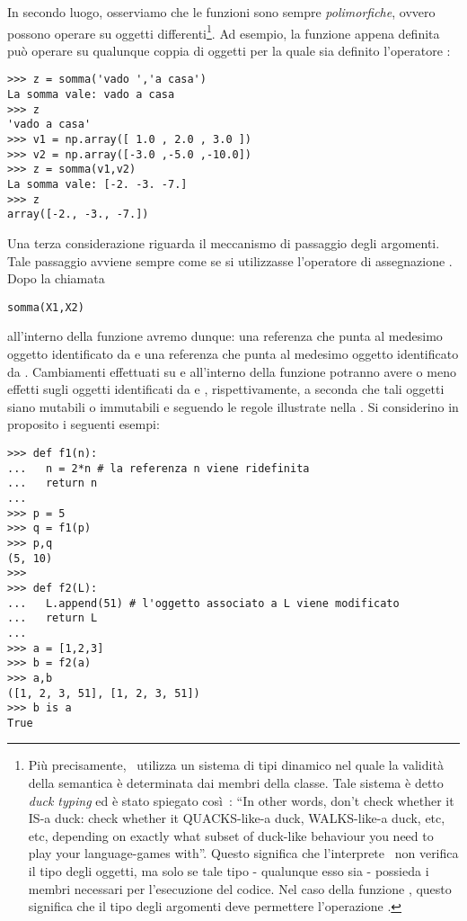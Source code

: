 In secondo luogo, osserviamo che le funzioni sono sempre
\emph{polimorfiche}, ovvero possono operare su
oggetti differenti\footnote{ Pi\`u precisamente, \python\ utilizza un
sistema di tipi dinamico nel quale la validit\`a della semantica \`e
determinata dai membri della classe. Tale sistema \`e detto \emph{duck
typing} ed \`e stato spiegato
cos\`i~\cite{martelli:ipsedixit}: ``In other words, don't check
whether it IS-a duck: check whether it QUACKS-like-a duck,
WALKS-like-a duck, etc, etc, depending on exactly what subset of
duck-like behaviour you need to play your language-games with''.
Questo significa che l'interprete \python\ non verifica il tipo degli
oggetti, ma solo se tale tipo - qualunque esso sia - possieda i membri
necessari per l'esecuzione del codice. Nel caso della funzione
, questo significa che il tipo degli argomenti deve
permettere l'operazione .}. Ad esempio, la funzione
 appena definita pu\`o operare su qualunque coppia di
oggetti per la quale sia definito l'operatore \istr{+}:
\begin{verbatim}
>>> z = somma('vado ','a casa')
La somma vale: vado a casa
>>> z
'vado a casa'
>>> v1 = np.array([ 1.0 , 2.0 , 3.0 ])
>>> v2 = np.array([-3.0 ,-5.0 ,-10.0])
>>> z = somma(v1,v2)
La somma vale: [-2. -3. -7.]
>>> z
array([-2., -3., -7.])
\end{verbatim}

Una terza considerazione riguarda il meccanismo di passaggio degli
argomenti. Tale passaggio avviene sempre come se si utilizzasse
l'operatore di assegnazione \istr{=}. Dopo la chiamata
\begin{verbatim}
somma(X1,X2)
\end{verbatim}
all'interno della funzione  avremo dunque: una referenza
 che punta al medesimo oggetto identificato da  e una
referenza  che punta al medesimo oggetto identificato da .
Cambiamenti effettuati su  e  all'interno della
funzione potranno avere o meno effetti sugli oggetti identificati da
 e ,
rispettivamente, a
seconda che tali oggetti siano mutabili o immutabili e seguendo le
regole illustrate nella . Si
considerino in proposito i seguenti esempi:
\begin{verbatim}
>>> def f1(n):
...   n = 2*n # la referenza n viene ridefinita
...   return n
... 
>>> p = 5
>>> q = f1(p)
>>> p,q
(5, 10)
>>> 
>>> def f2(L):
...   L.append(51) # l'oggetto associato a L viene modificato
...   return L
... 
>>> a = [1,2,3]
>>> b = f2(a)
>>> a,b
([1, 2, 3, 51], [1, 2, 3, 51])
>>> b is a
True
\end{verbatim}
